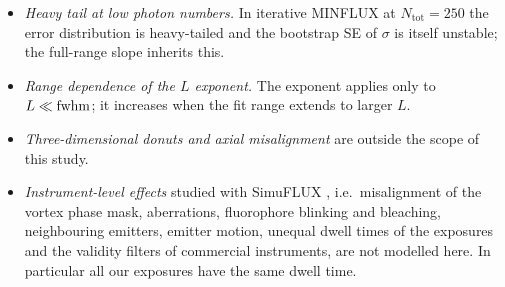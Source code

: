 \begin{itemize}
vectorial donut as a function of the filling factor ($n=1.5$) agree to within a few percent with
the values we transcribed from Fig.~10 of Ref.~\cite{Caprile2022} at filling factors $0.5$, $2$
and uniform illumination, but differ clearly at filling factor $1$. We do not claim agreement
there; an independent comparison is pending.
\item \emph{Heavy tail at low photon numbers.} In iterative MINFLUX at $N_{\mathrm{tot}}=250$
the error distribution is heavy-tailed and the bootstrap SE of $\sigma$ is itself unstable; the
full-range slope inherits this.
\item \emph{Range dependence of the $L$ exponent.} The exponent
 applies only to $L\ll\mathrm{fwhm}$; it increases when the fit
range extends to larger $L$.
\item \emph{Three-dimensional donuts and axial misalignment} are outside the scope of this study.
\item \emph{Instrument-level effects} studied with SimuFLUX \cite{MarinRies2026}, i.e.\
misalignment of the vortex phase mask, aberrations, fluorophore blinking and bleaching,
neighbouring emitters, emitter motion, unequal dwell times of the exposures and the validity
filters of commercial instruments, are not modelled here. In particular all our exposures have
the same dwell time.
\end{itemize}
